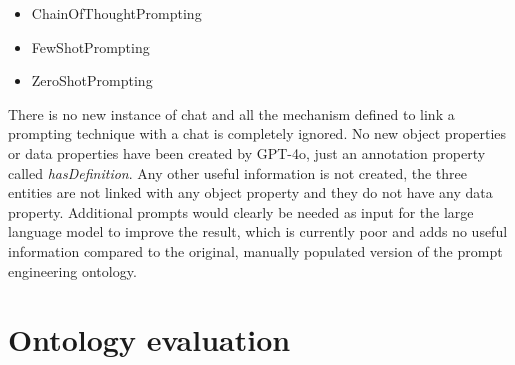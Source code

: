 \begin{itemize}
    \item ChainOfThoughtPrompting
    \item FewShotPrompting
    \item ZeroShotPrompting
\end{itemize}
There is no new instance of chat and all the mechanism defined to link a prompting technique with a chat is completely ignored. No new object properties or data properties have been created by GPT-4o, just an annotation property called \textit{hasDefinition}. Any other useful information is not created, the three entities are not linked with any object property and they do not have any data property. Additional prompts would clearly be needed as input for the large language model to improve the result, which is currently poor and adds no useful information compared to the original, manually populated version of the prompt engineering ontology.

\newpage
\section{Ontology evaluation}

